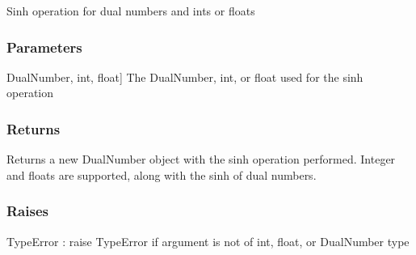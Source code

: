 \documentclass[letterpaper,10pt,english]{sphinxmanual}
\begin{document}
\begin{fulllineitems}
\label{\detokenize{autodiff:autodiff.operators.sinh}}
\pysigstartsignatures
{}
\pysigstopsignatures
\sphinxAtStartPar
Sinh operation for dual numbers and ints or floats


\subsubsection{Parameters}
\label{\detokenize{autodiff:id36}}\begin{description}
\sphinxlineitem{x}{[}DualNumber, int, float{]}
\sphinxAtStartPar
The DualNumber, int, or float used for the sinh operation

\end{description}


\subsubsection{Returns}
\label{\detokenize{autodiff:id37}}\begin{description}
\sphinxAtStartPar
Returns a new DualNumber object with the sinh operation performed. Integer and
floats are supported, along with the sinh of dual numbers.

\end{description}


\subsubsection{Raises}
\label{\detokenize{autodiff:id38}}
\sphinxAtStartPar
TypeError : raise TypeError if argument is not of int, float, or DualNumber type

\end{fulllineitems}

\end{document}
